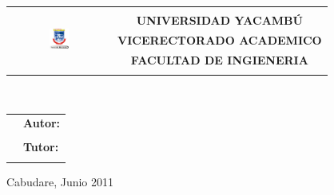 \thispagestyle{empty}
\begin{tabular*}{0.82\textwidth}{@{\extracolsep{\fill}} cc }
  \multirow{6}{*}{\includegraphics[width=0.20\textwidth]{img/UNY.png}} 
  & 						\\
  & \large{\textbf{UNIVERSIDAD YACAMBÚ}} 	\\
  & \large{\textbf{VICERECTORADO ACADEMICO}} 	\\
  & \large{\textbf{FACULTAD DE INGIENERIA}} 	\\
  & 						\\
\end{tabular*}
\vspace{6cm}
\begin{center}
\Large{\textbf{\Titulo}}\\
\end{center}
\vspace{3.5cm}
\begin{tabular}{l l}
    \hspace{65mm}	&	\textbf{Autor:}	\\
			&	\Autor		\\
			&	\textbf{Tutor:}	\\
			&	\Tutor		\\
\end{tabular}
\vspace{4.5cm}
\begin{center}
Cabudare, Junio 2011\\
\end{center}